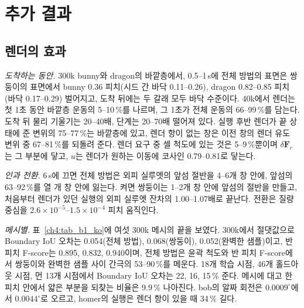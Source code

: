 \section{추가 결과}
\label{app:ch4_results_ko}

\subsection{렌더의 효과}
\textit{도착하는 동안.} 300k bunny와 dragon의 바깥층에서, 0.5--1\,s에 전체 방법의 표면은 쌍둥이의 표면에서 bunny 0.36 피치(시드
간 바닥 0.11--0.26), dragon 0.82--0.85 피치(바닥 0.17--0.29) 벌어지고, 도착 뒤에는 두 갈래 모두 바닥 수준이다. 40k에서 렌더는
첫 1초 동안 바깥층 운동의 5--10\,\%를 나르며, 그 1초가 전체 운동의 66--99\,\%를 담는다. 도착 뒤 물리 기울기는 20--40배, 단계는
20--70배 떨어져 있다. 실행 후반 렌더가 끝 상태에 준 변위의 75--77\,\%는 바깥층에 있고, 렌더 항이 없는 창은 이전 창의 렌더 유도
변위 중 67--81\,\%를 되돌려 준다. 렌더 요구 중 셀 척도에 있는 것은 5--9\,\%뿐이며 $\delta\mathbf{F}_c$는 그 부분에 닿고, $u$는
렌더가 원하는 이동에 코사인 0.79--0.81로 닿는다.

\textit{인과 전환.} 6\,s에 끄면 전체 방법은 외피 실루엣의 앞섬 절반을 4--6개 창 안에, 앞섬의 63--92\,\%를 열 개 창 안에 잃는다.
켜면 쌍둥이는 1--2개 창 안에 앞섬의 절반을 만들고, 처음부터 렌더가 있던 실행의 외피 실루엣 잔차의 1.00--1.07배로 끝난다.
전환은 질량 중심을 $2.6\times10^{-5}$--$1.5\times10^{-4}$ 피치 움직인다.

\textit{메시별.} 표~\ref{ch4:tab_b1_ko}에 여섯 300k 메시의 끝을 보였다. 300k에서 절댓값으로 Boundary IoU 오차는 0.054(전체 방법),
0.068(쌍둥이), 0.052(완벽한 샘플)이고, 반 피치 F-score는 0.895, 0.832, 0.940이며, 전체 방법은 윤곽 척도와 반 피치 F-score에서
쌍둥이와 완벽한 샘플 사이 간극의 53--90\,\%를 메운다. 18개 학습 시점, 46개 홀드아웃 시점, 먼 13개 시점에서 Boundary IoU
오차는 22, 16, 15\,\% 준다. 메시에 대고 한 피치 안에서 얇은 부분을 되찾는 비율은 9.9\,\% 나아진다. bob의 알짜 회전은
$0.0009^\circ$에서 $0.0044^\circ$로 오르고, homer의 실행은 렌더 항이 있을 때 34\,\% 길다.

